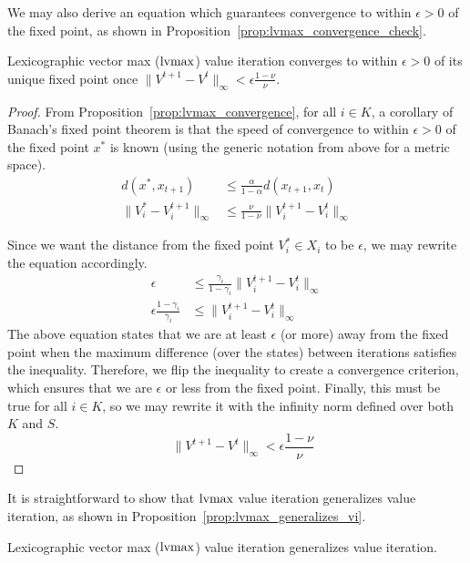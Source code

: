 We may also derive an equation which guarantees convergence to within $\epsilon > 0$ of the fixed point, as shown in Proposition~\ref{prop:lvmax_convergence_check}.

\begin{proposition}
    \label{prop:lvmax_convergence_check}
    Lexicographic vector max ($\operatorname*{lvmax}$) value iteration converges to within $\epsilon > 0$ of its unique fixed point once $\| V^{t+1} - V^t \|_\infty < \epsilon \frac{1 - \nu}{\nu}$.
\end{proposition}

\begin{proof}
From Proposition~\ref{prop:lvmax_convergence}, for all $i \in K$, a corollary of Banach's fixed point theorem is that the speed of convergence to within $\epsilon > 0$ of the fixed point $x^*$ is known (using the generic notation from above for a metric space).
\begin{align*}
    d(x^*, x_{t+1}) &\leq \frac{\alpha}{1 - \alpha} d(x_{t+1}, x_t) \\
    \| V_i^* - V_i^{t+1}\|_\infty &\leq \frac{\nu}{1 - \nu} \| V_i^{t+1} - V_i^t \|_\infty
\end{align*}

Since we want the distance from the fixed point $V_i^* \in X_i$ to be $\epsilon$, we may rewrite the equation accordingly.
\begin{align*}
    \epsilon &\leq \frac{\gamma_i}{1 - \gamma_i} \| V_i^{t+1} - V_i^t \|_\infty \\
    \epsilon \frac{1 - \gamma_i}{\gamma_i} &\leq \| V_i^{t+1} - V_i^t \|_\infty
\end{align*}
The above equation states that we are at least $\epsilon$ (or more) away from the fixed point when the maximum difference (over the states) between iterations satisfies the inequality. Therefore, we flip the inequality to create a convergence criterion, which ensures that we are $\epsilon$ or less from the fixed point. Finally, this must be true for all $i \in K$, so we may rewrite it with the infinity norm defined over both $K$ and $S$.
\begin{equation*}
    \quad \| V^{t+1} - V^t \|_\infty < \epsilon \frac{1 - \nu}{\nu}
\end{equation*}
\end{proof}

It is straightforward to show that $\operatorname*{lvmax}$ value iteration generalizes value iteration, as shown in Proposition~\ref{prop:lvmax_generalizes_vi}.
\begin{proposition}
    \label{prop:lvmax_generalizes_vi}
    Lexicographic vector max ($\operatorname*{lvmax}$) value iteration generalizes value iteration.
\end{proposition}

